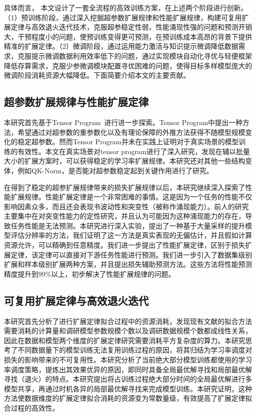 具体而言， 本文设计了一套全流程的高效训练方案，在上述两个阶段进行创新。（1）预训练阶段，通过深入挖掘超参数扩展规律和性能扩展规律，构建可复用扩展定律与高效退火迭代技术，克服超参稳定性弱，性能涌现性强的问题和预测开销大，干预程度小的问题，使预训练变得更可预测，在预训练成本高昂的背景下提供精准的扩展定律。（2）微调阶段，通过运用能力激活与知识提示微调降低数据需求，克服提示微调数据利用效率低下的问题，通过实现模块自动化寻优与轻便框架降低存算需求，克服少参微调模块配置寻优困难的问题，使得目标多样模型庞大的微调阶段消耗资源大幅降低。下面简要介绍本文的主要贡献。

\subsection{超参数扩展规律与性能扩展定律}
本研究首先基于Tensor Program~\cite{}进行进一步探索。Tensor Program中提出一种方法，希望通过对超参数的重参数化以及有理论保障的外推方法获得不随模型规模变化的稳定超参数。然而Tensor Program并未在实践上证明对于真实场景的模型训练的有效性。本文在真实场景对tensor program进行了深入研究，发现在辅以批量大小的扩展方案时，可以获得稳定的学习率扩展规律。本研究还对其他一些结构变体，例如QK-Norm，是否能对超参数稳定起到关键作用进行了研究。

在得到了稳定的超参扩展规律带来的损失扩展规律以后，本研究继续深入探索了性能扩展规律。性能扩展定律是一个非常困难的事情。这是因为一个任务的性能不仅影响因素众多，而且还会表现书波动性和突变性（被称作涌现能力）。前人的研究主要集中在对突变性能力的定性研究，并且认为可能因为这种涌现能力的存在，导致任务性能是无法预测。本研究进行深入实验，提出了一种基于大量采样的提升模型评估分辨率的方法，我们证明了这一方法是真实表现的无偏估计，并且假如计算资源允许，可以精确到任意精度。我们进一步提出了性能扩展定律，区别于损失扩展定律，该定律可以直接对下游任务性能进行预测。我们进一步引入了数据集级别扩展和样本级别扩展两种方案，并且提出损失辅助预测方法。这些方法将性能预测精度提升到99\%以上，初步解决了性能扩展规律的问题。

\subsection{可复用扩展定律与高效退火迭代}
本研究首先分析了进行扩展定律拟合过程中的资源消耗，发现现有文献的拟合方法需要消耗的计算量和调研模型参数规模个数以及调研数据规模个数都成线性关系，因此在数据和模型两个维度的扩展定律研究需要消耗平方复杂度的算力。本研究思考了不同数据量下的模型训练无法复用训练过程的原因，将其归结为学习率调度对损失的影响带来的不可复用性。本研究分析了当前绝大部分模型训练都使用的学习率调度策略，提炼出其效果优异的原因，即同时具备全局最优解寻找和局部最优解寻找（退火）的特点。本研究提出将占训练过程绝大部分时间的全局最优解进行多模型共享，再通过时机各异的局部最优解寻找来完成模型训练。本研究证明，这种方法使数据维度的扩展定律拟合消耗的资源变为常数量级，有效提高了扩展定律拟合过程的高效性。

